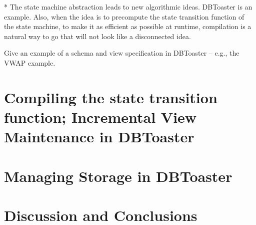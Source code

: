 \documentclass{sig-alternate}
\begin{document}
* The state machine abstraction leads to new algorithmic ideas. DBToaster is an example. Also, when the idea is to precompute the state transition function of the state machine, to make it as efficient as possible at runtime, compilation is a natural way to go that will not look like a disconnected idea.




Give an example of a schema and view specification in DBToaster -- e.g., the VWAP example.





\section{Compiling the state transition function; Incremental View Maintenance
in DBToaster}




\section{Managing Storage in DBToaster}



\section{Discussion and Conclusions}
\end{document}
